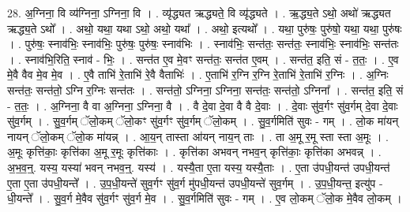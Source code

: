 \documentclass[17pt]{extarticle}
\begin{document}
28. अ॒ग्निना॒ वि व्य॑ग्निना॒ ऽग्निना॒ वि । . व्यृ॑द्ध्यत ऋद्ध्यते॒ वि व्यृ॑द्ध्यते । . ऋ॒द्ध्य॒ते ऽथो॒ अथो॑ ऋद्ध्यत ऋद्ध्य॒ते ऽथो᳚ । . अथो॒ यथा॒ यथा ऽथो॒ अथो॒ यथा᳚ । . अथो॒ इत्यथो᳚ । . यथा॒ पुरु॑षः॒ पुरु॑षो॒ यथा॒ यथा॒ पुरु॑षः । . पुरु॑षः॒ स्नाव॑भिः॒ स्नाव॑भिः॒ पुरु॑षः॒ पुरु॑षः॒ स्नाव॑भिः । . स्नाव॑भिः॒ सन्त॑तः॒ सन्त॑तः॒ स्नाव॑भिः॒ स्नाव॑भिः॒ सन्त॑तः । . स्नाव॑भि॒रिति॒ स्नाव॑ - भिः॒ । . सन्त॑त ए॒व मे॒वꣳ सन्त॑तः॒ सन्त॑त ए॒वम् । . सन्त॑त॒ इति॒ सं - त॒तः॒ । . ए॒व मे॒वै वैव मे॒व मे॒व । . ए॒वै ताभि॑ रे॒ताभि॑ रे॒वै वैताभिः॑ । . ए॒ताभि॑ र॒ग्नि र॒ग्नि रे॒ताभि॑ रे॒ताभि॑ र॒ग्निः । . अ॒ग्निः सन्त॑तः॒ सन्त॑तो॒ ऽग्नि र॒ग्निः सन्त॑तः । . सन्त॑तो॒ ऽग्निना॒ ऽग्निना॒ सन्त॑तः॒ सन्त॑तो॒ ऽग्निना᳚ । . सन्त॑त॒ इति॒ सं - त॒तः॒ । . अ॒ग्निना॒ वै वा अ॒ग्निना॒ ऽग्निना॒ वै । . वै दे॒वा दे॒वा वै वै दे॒वाः । . दे॒वाः सु॑व॒र्गꣳ सु॑व॒र्गम् दे॒वा दे॒वाः सु॑व॒र्गम् । . सु॒व॒र्गम् ॅलो॒कम् ॅलो॒कꣳ सु॑व॒र्गꣳ सु॑व॒र्गम् ॅलो॒कम् । . सु॒व॒र्गमिति॑ सुवः - गम् । . लो॒क मा॑यन् नायन् ॅलो॒कम् ॅलो॒क मा॑यन्न् । . आ॒य॒न् तास्ता आ॑यन् नाय॒न् ताः । . ता अ॒मू र॒मू स्ता स्ता अ॒मूः । . अ॒मूः कृत्ति॑काः॒ कृत्ति॑का अ॒मू र॒मूः कृत्ति॑काः । . कृत्ति॑का अभवन् नभव॒न् कृत्ति॑काः॒ कृत्ति॑का अभवन्न् । . अ॒भ॒व॒न्॒. यस्य॒ यस्या॑ भवन् नभव॒न्॒. यस्य॑ । . यस्यै॒ता ए॒ता यस्य॒ यस्यै॒ताः । . ए॒ता उ॑पधी॒यन्त॑ उपधी॒यन्त॑ ए॒ता ए॒ता उ॑पधी॒यन्ते᳚ । . उ॒प॒धी॒यन्ते॑ सुव॒र्गꣳ सु॑व॒र्ग मु॑पधी॒यन्त॑ उपधी॒यन्ते॑ सुव॒र्गम् । . उ॒प॒धी॒यन्त॒ इत्यु॑प - धी॒यन्ते᳚ । . सु॒व॒र्ग मे॒वैव सु॑व॒र्गꣳ सु॑व॒र्ग मे॒व । . सु॒व॒र्गमिति॑ सुवः - गम् । . ए॒व लो॒कम् ॅलो॒क मे॒वैव लो॒कम् । \newline
\end{document}
